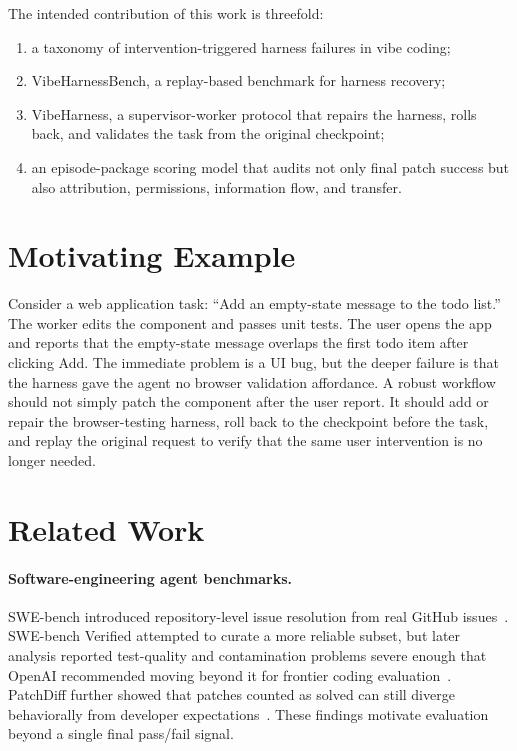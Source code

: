 \documentclass[11pt]{article}
\begin{document}
The intended contribution of this work is threefold:

\begin{enumerate}[leftmargin=*]
  \item a taxonomy of intervention-triggered harness failures in vibe coding;
  \item VibeHarnessBench, a replay-based benchmark for harness recovery;
  \item VibeHarness, a supervisor-worker protocol that repairs the harness,
  rolls back, and validates the task from the original checkpoint;
  \item an episode-package scoring model that audits not only final patch
  success but also attribution, permissions, information flow, and transfer.
\end{enumerate}

\section{Motivating Example}

Consider a web application task: ``Add an empty-state message to the todo list.''
The worker edits the component and passes unit tests. The user opens the app and
reports that the empty-state message overlaps the first todo item after clicking
Add. The immediate problem is a UI bug, but the deeper failure is that the
harness gave the agent no browser validation affordance. A robust workflow should
not simply patch the component after the user report. It should add or repair the
browser-testing harness, roll back to the checkpoint before the task, and replay
the original request to verify that the same user intervention is no longer
needed.

\section{Related Work}

\paragraph{Software-engineering agent benchmarks.}
SWE-bench introduced repository-level issue resolution from real GitHub
issues~\cite{jimenez2024swebench}. SWE-bench Verified attempted to curate a more
reliable subset, but later analysis reported test-quality and contamination
problems severe enough that OpenAI recommended moving beyond it for frontier
coding evaluation~\cite{openai2026swebenchverified}. PatchDiff further showed
that patches counted as solved can still diverge behaviorally from developer
expectations~\cite{wang2025solved}. These findings motivate evaluation beyond a
single final pass/fail signal.
\end{document}
